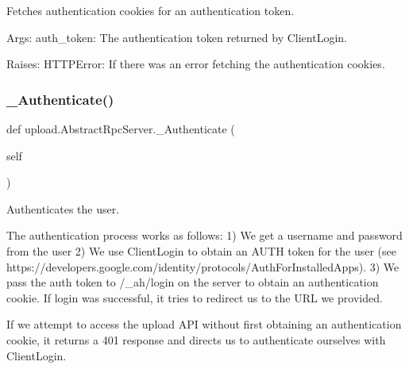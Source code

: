 \begin{DoxyVerb}Fetches authentication cookies for an authentication token.

Args:
  auth_token: The authentication token returned by ClientLogin.

Raises:
  HTTPError: If there was an error fetching the authentication cookies.
\end{DoxyVerb}
 \mbox{\label{classupload_1_1_abstract_rpc_server_a8517a9d90ee2478752a53302f01d868d}} 
\subsubsection{\texorpdfstring{\+\_\+\+Authenticate()}{\_Authenticate()}}
{\footnotesize\ttfamily def upload.\+Abstract\+Rpc\+Server.\+\_\+\+Authenticate (\begin{DoxyParamCaption}\item[{}]{self }\end{DoxyParamCaption})\hspace{0.3cm}{\ttfamily [private]}}

\begin{DoxyVerb}Authenticates the user.

The authentication process works as follows:
 1) We get a username and password from the user
 2) We use ClientLogin to obtain an AUTH token for the user
(see https://developers.google.com/identity/protocols/AuthForInstalledApps).
 3) We pass the auth token to /_ah/login on the server to obtain an
authentication cookie. If login was successful, it tries to redirect
us to the URL we provided.

If we attempt to access the upload API without first obtaining an
authentication cookie, it returns a 401 response and directs us to
authenticate ourselves with ClientLogin.
\end{DoxyVerb}
 \mbox{\label{classupload_1_1_abstract_rpc_server_ac1b913f8bd00da4741c47ab49ea94cb5}} 
